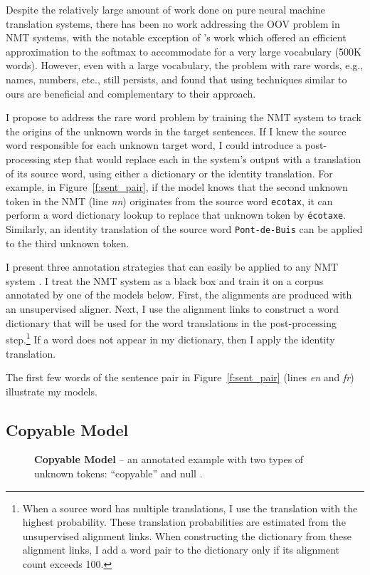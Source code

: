 Despite the relatively large amount of work done on pure neural machine translation systems, 
there has been no work addressing the OOV problem in NMT systems, 
with the notable exception of 's work which offered 
an efficient approximation to the softmax to accommodate for a very large vocabulary (500K words). However, even with a large vocabulary, the problem with rare words, e.g., names, numbers, etc., still persists, and  found that using techniques similar to ours are beneficial and complementary to their approach.

I propose to address the rare word problem by training the NMT system
to track the origins of the unknown words in the target sentences.  If
I knew the source word responsible for each unknown target word, I could introduce
a post-processing step that would replace each \unksym{} in the system's output
with a translation of its source word, using 
either a dictionary or the identity translation.  For example, in
Figure~\ref{f:sent_pair}, if the model knows that the second unknown token 
in the NMT (line {\it nn}) originates from the source
word \texttt{ecotax}, it can perform a word dictionary lookup to
replace that unknown token by \texttt{\'{e}cotaxe}. Similarly, an
identity translation of the source word \texttt{Pont-de-Buis} can be
applied to the third unknown token.

I present three annotation strategies that can easily be applied to any NMT system \cite{kal13,sutskever14,cho14}. 
I treat the NMT system as a black box and train it on a corpus annotated by one of the models below. 
First, the alignments are produced with an unsupervised aligner. 
Next, I use the alignment links to construct a word dictionary that will 
be used for the word translations in the post-processing step.\footnote{When a source word has multiple translations, I use the translation with the highest probability. These translation probabilities are estimated from the unsupervised alignment links. When constructing the dictionary from these alignment links, I add a word pair to the dictionary only if its alignment count exceeds 100.}
If a word does not appear in my dictionary, then I apply the identity translation.

The first few words of the sentence pair in Figure~\ref{f:sent_pair} (lines {\it en}
and {\it fr}) illustrate my models. 

\subsection{Copyable Model}
\label{subsec:copyable}
\begin{figure}
\caption[Copyable Model]{ {\bf Copyable Model} -- an annotated example with two 
types of unknown tokens: ``copyable''  and null \unknull{}.}
\label{f:copyable}
\end{figure}

